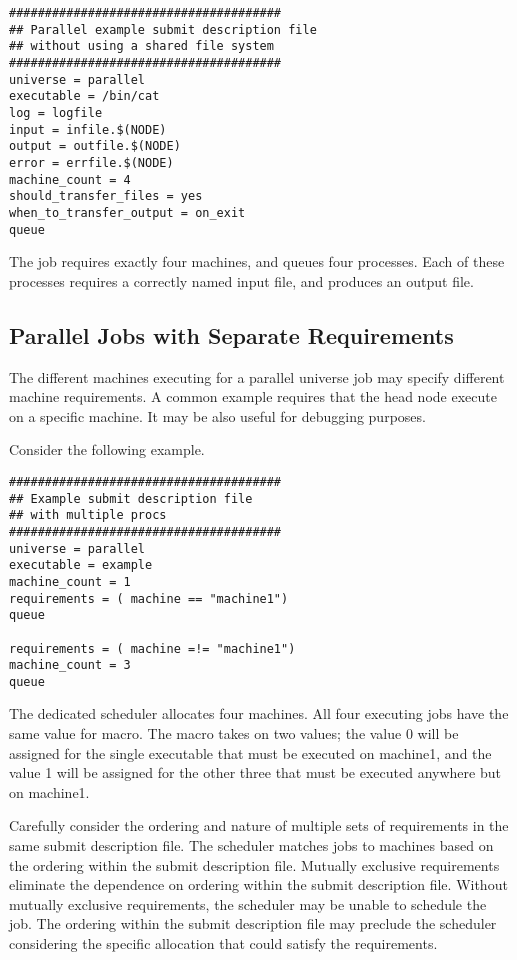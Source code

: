 \begin{verbatim}
######################################
## Parallel example submit description file
## without using a shared file system
######################################
universe = parallel
executable = /bin/cat
log = logfile
input = infile.$(NODE)
output = outfile.$(NODE)
error = errfile.$(NODE)
machine_count = 4
should_transfer_files = yes
when_to_transfer_output = on_exit
queue
\end{verbatim}

The job requires exactly four machines,
and queues four processes.
Each of these processes requires a correctly named input file,
and produces an output file.

\subsection{\label{sec:parallel-multi-proc}Parallel Jobs with Separate Requirements}

The different machines executing for a parallel universe job
may specify different machine requirements.
A common example requires that the
head node execute on a specific machine.
It may be also useful for debugging purposes.

Consider the following example.

\begin{verbatim}
######################################
## Example submit description file
## with multiple procs
######################################
universe = parallel
executable = example
machine_count = 1
requirements = ( machine == "machine1")
queue

requirements = ( machine =!= "machine1")
machine_count = 3
queue
\end{verbatim}

The dedicated scheduler allocates four machines.
All four executing jobs have the same value for 
macro.
The  macro takes on two values;
the value 0 will be assigned for the single executable
that must be executed on machine1, and
the value 1 will be assigned for the other three 
that must be executed anywhere but on machine1.

Carefully consider the ordering and nature of multiple
sets of requirements in the same submit description file.
The scheduler matches jobs to machines based on the ordering
within the submit description file.
Mutually exclusive requirements eliminate the dependence on
ordering within the submit description file.
Without mutually exclusive requirements,
the scheduler may be unable to schedule the job.
The ordering within the submit description file may preclude
the scheduler considering the specific allocation that
could satisfy the requirements.



